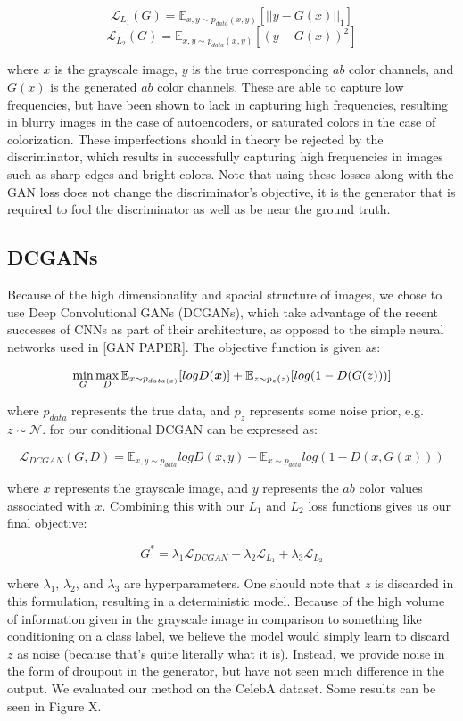 \documentclass{article} %
\begin{document}
\[ \mathcal{L}_{L_1}(G) = \mathbb{E}_{x,y\sim p_{data}(x,y)}[||y-G(x)||_1] \]
\[ \mathcal{L}_{L_2}(G) = \mathbb{E}_{x,y\sim p_{data}(x,y)}[(y-G(x))^2] \]


\noindent where $x$ is the grayscale image, $y$ is the true corresponding $ab$ color channels, and $G(x)$ is the generated $ab$ color channels. These are able to capture low frequencies, but have been shown to lack in 
capturing high frequencies, resulting in blurry images in the case of autoencoders, or saturated colors in
the case of colorization. These imperfections should in theory be rejected by the discriminator, which
results in successfully capturing high frequencies in images such as sharp edges and bright colors. Note
that using these losses along with the GAN loss does not change the discriminator's objective, it is the
generator that is required to fool the discriminator as well as be near the ground truth.

\subsection{DCGANs}
Because of the high dimensionality and spacial structure of images, we chose to use Deep Convolutional GANs
(DCGANs), which take advantage of the recent successes of CNNs as part of
their architecture, as opposed to the simple neural networks used in [GAN PAPER]. The objective function is
given as:

\[\min\limits_{G}\max\limits_{D} \mathbb{E}_{x \sim p_{data(x)}} [logD(\textbf{\textit{x}})] + \mathbb{E}_{z \sim p_z(z)}[log(1 - D(G(z)))]\]

\noindent where $p_{data}$ represents the true data, and $p_z$ represents some noise prior, e.g.
$z \sim \mathcal{N}$. 
for our conditional DCGAN can be expressed as:

\[ \mathcal{L}_{DCGAN}(G,D) = \mathbb{E}_{x,y \sim p_{data}} log D(x,y) + \mathbb{E}_{x \sim p_{data}}
log (1-D(x, G(x)))\]

\noindent where $x$ represents the grayscale image, and $y$ represents the $ab$ color values associated with
$x$. Combining this with our $L_1$ and $L_2$ loss functions gives us our final objective:

\[ G^* = \lambda_1 \mathcal{L}_{DCGAN} + \lambda_2 \mathcal{L}_{L_1} + \lambda_3 \mathcal{L}_{L_2} \]

\noindent where $\lambda_1$, $\lambda_2$, and $\lambda_3$ are hyperparameters. One should note that $z$
is discarded in this formulation, resulting in a deterministic model. Because of the high volume of information
given in the grayscale image in comparison to something like
conditioning on a class label, we believe the model would simply learn to discard $z$ as noise
(because that's quite literally what it is). Instead, we provide noise in the form of droupout in the
generator, but have not seen much difference in the output. We evaluated our method on the CelebA
dataset. Some results can be seen in Figure X. 
\end{document}
